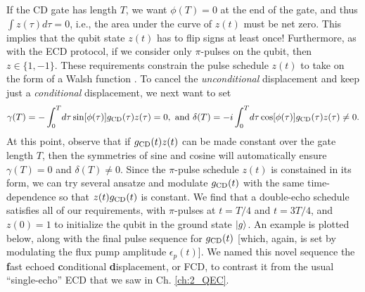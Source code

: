 If the CD gate has length $T$, we want $\phi(T) = 0$ at the end of the gate, and thus $\int z(\tau)d\tau = 0$, i.e., the area under the curve of $z(t)$ must be net zero. This implies that the qubit state $z(t)$ has to flip signs at least once! Furthermore, as with the ECD protocol, if we consider only $\pi$-pulses on the qubit, then $z \in \{1, -1\}$. These requirements constrain the pulse schedule $z(t)$ to take on the form of a Walsh function \cite{chalermpusitarak2021frame}. To cancel the \textit{unconditional} displacement and keep just a \textit{conditional} displacement, we next want to set
\begin{equation*}
    \gamma(T) = - \int_0^T \!d\tau \sin[\phi(\tau)] g_{\rm CD}(\tau)z(\tau) = 0, \,\,\text{and}\,\, \delta(T) = -i \int_0^T \!d\tau \cos[\phi(\tau)] g_{\rm CD}(\tau)z(\tau) \neq 0.
\end{equation*}
At this point, observe that if $g_{\rm CD}(t)z(t)$ can be made constant over the gate length $T$, then the symmetries of sine and cosine will automatically ensure $\gamma(T) = 0$ and $\delta(T) \neq 0$. Since the $\pi$-pulse schedule $z(t)$ is constained in its form, we can try several ansatze and modulate $g_{\rm CD}(t)$ with the same time-dependence so that $z(t)g_{\rm CD}(t)$ is constant. We find that a double-echo schedule satisfies all of our requirements, with $\pi$-pulses at $t = T/4$ and $t = 3T/4$, and $z(0)=1$ to initialize the qubit in the ground state $\lvert g\rangle$. An example is plotted below, along with the final pulse sequence for $g_{\rm CD}(t)$ [which, again, is set by modulating the flux pump amplitude $\epsilon_p(t)$]. We named this novel sequence the \textbf{f}ast echoed \textbf{c}onditional \textbf{d}isplacement, or FCD, to contrast it from the usual ``single-echo'' ECD that we saw in Ch. \ref{ch:2_QEC}. 

